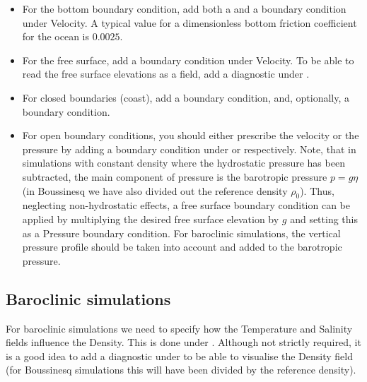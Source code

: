 \begin{itemize}
  \item For the bottom boundary condition, add both a  and a
     boundary condition under Velocity. A
    typical value for a dimensionless bottom friction coefficient for the ocean
    is $0.0025$.
  \item For the free surface, add a  boundary
    condition under Velocity. To be able to read the free surface elevations as
    a field, add a diagnostic  under
    .
  \item For closed boundaries (coast), add a 
    boundary condition, and, optionally, a  boundary
    condition.
  \item For open boundary conditions, you should either prescribe the velocity
    or the pressure by adding a  boundary condition
    under  or 
    respectively. Note, that in simulations with constant density where the
    hydrostatic pressure has been subtracted, the main component of pressure is
    the barotropic pressure $p=g\eta$ (in Boussinesq we have also divided out
    the reference density $\rho_0$). Thus, neglecting non-hydrostatic effects, a
    free surface boundary condition can be applied by multiplying the desired
    free surface elevation by $g$ and setting this as a 
    Pressure boundary condition. For baroclinic simulations, the vertical
    pressure profile should be taken into account and added to the barotropic
    pressure.
\end{itemize}

\subsection{Baroclinic simulations}
For baroclinic simulations we need to specify how the Temperature and Salinity
fields influence the Density. This is done under
.
Although not strictly required, it is a good idea
to add a diagnostic  under
 to be able to visualise the Density field (for
Boussinesq simulations this will have been divided by the reference density).

